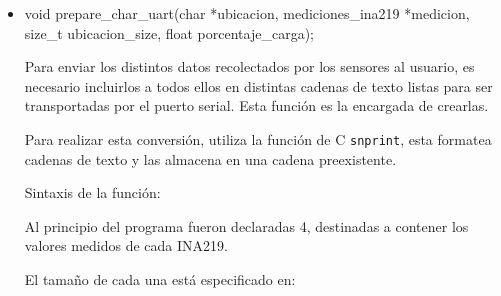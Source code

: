                 \begin{itemize} [label = ·]
                \setlength{\itemindent}{1.5em}
                
                    \item void prepare\_char\_uart(char *ubicacion, mediciones\_ina219 *medicion, size\_t ubicacion\_size, float porcentaje\_carga);\par
                    
                        Para enviar los distintos datos recolectados por los sensores al usuario, es necesario incluirlos a todos ellos en distintas cadenas de texto listas para ser transportadas por el puerto serial. Esta función es la encargada de crearlas.\par
                        Para realizar esta conversión, utiliza la función de C \texttt{snprint}, esta formatea cadenas de texto y las almacena en una cadena preexistente.\par
                        Sintaxis de la función:\par
                        
                        
                        
                        Al principio del programa fueron declaradas 4, destinadas a contener los valores medidos de cada INA219.\par

                        \par
                        
                        El tamaño de cada una está especificado en:\par
                        
                        \par
                        

\end{itemize}

